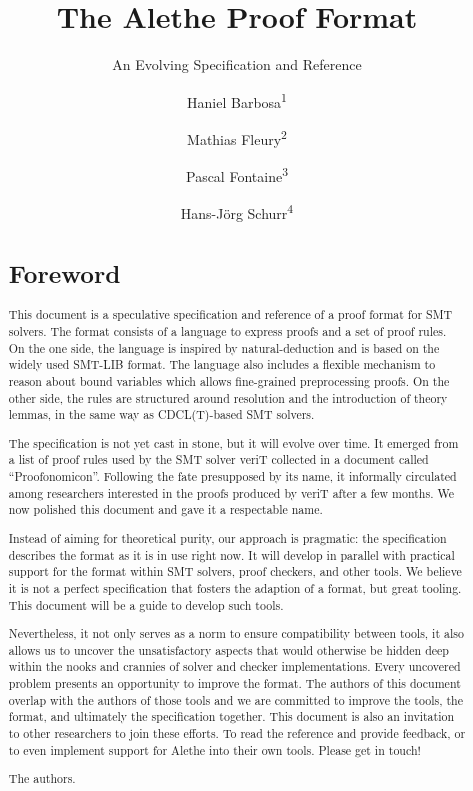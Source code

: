\documentclass{scrartcl}
\title{The Alethe Proof Format}
\subtitle{An Evolving Specification and Reference}
\author{Haniel Barbosa\textsuperscript{1}
\and Mathias Fleury\textsuperscript{2}
\and Pascal Fontaine\textsuperscript{3}
\and Hans-Jörg Schurr\textsuperscript{4}}
\date{}
\begin{document}
\maketitle
\tableofcontents
\clearpage

\begin{abstract}
\section*{Foreword}
This document is a speculative specification and reference of a proof
format for SMT solvers.  The format consists of a language to express
proofs and a set of proof rules.  On the one side, the language is
inspired by natural-deduction and is based on the widely used SMT-LIB
format.  The language also includes a flexible mechanism to reason
about bound variables which allows fine-grained preprocessing proofs.
%
On the other side, the rules are structured around resolution and the
introduction of theory lemmas, in the same way as CDCL(T)-based SMT
solvers.

The specification is not yet
cast in stone, but it will evolve over time. It emerged from a list
of proof rules used by the SMT solver veriT collected in a document
called ``Proofonomicon''. Following the fate presupposed by its name,
it informally circulated among researchers interested in the proofs
produced by veriT after a few months.  We now polished this document
and gave it a respectable name.

Instead of aiming for theoretical purity, our approach
is pragmatic: the specification describes the format as it is in use
right now. It will develop in parallel with practical support for the
format within SMT solvers, proof checkers, and other tools.  We believe
it is not a perfect specification that fosters the adaption of a format,
but great tooling. This document will be a guide to develop
such tools.

Nevertheless, it not only serves as a norm to ensure compatibility
between tools, it also allows us to uncover the unsatisfactory aspects
that would otherwise be hidden deep within the nooks and crannies of
solver and checker implementations.
%
Every uncovered problem presents an opportunity
to improve the format. The authors of this document overlap with the
authors of those tools and we are committed to improve the tools, the
format, and ultimately the specification together.
This document is also an invitation to other researchers to join
these efforts. To read the reference and provide feedback, or to even
implement support for Alethe into their own tools. Please
get in touch!

\bigskip
\hspace*{\fill}The authors.
\end{abstract}
\end{document}
